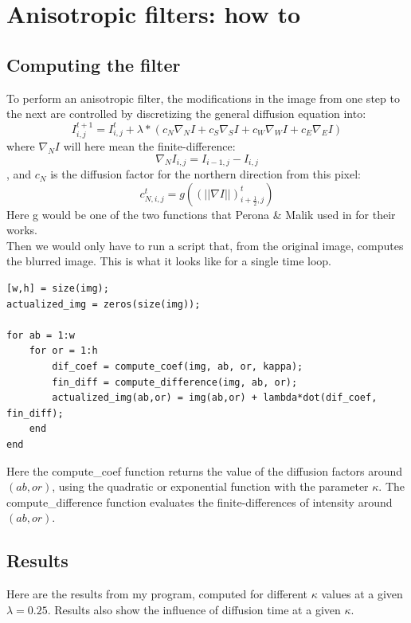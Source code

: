 \documentclass[12pt,a4paper]{article}
\begin{document}
\section{Anisotropic filters: how to}

\subsection{Computing the filter}

To perform an anisotropic filter, the modifications in the image from one step to the next are controlled by discretizing the general diffusion equation into:
\begin{equation}
I_{i,j}^{t+1} = I_{i,j}^{t} + \lambda * (c_{N} \nabla_{N}I + c_{S} \nabla_{S}I + c_{W} \nabla_{W}I + c_{E} \nabla_{E}I)
\end{equation}
where $\nabla_{N}I$ will here mean the finite-difference:
\begin{equation}
\nabla_{N}I_{i,j} = I_{i-1,j} - I_{i,j}
\end{equation} , and $c_{N}$ is the diffusion factor for the northern direction from this pixel: 
\begin{equation}
c_{N,i,j}^{t} = g((||\nabla I||)_{i+\frac{1}{2},j}^{t})
\end{equation}
Here g would be one of the two functions that Perona \& Malik used in for their works.
\\
Then we would only have to run a script that, from the original image, computes the blurred image. This is what it looks like for a single time loop.
\begin{lstlisting}
[w,h] = size(img);
actualized_img = zeros(size(img));

for ab = 1:w
	for or = 1:h
		dif_coef = compute_coef(img, ab, or, kappa);
		fin_diff = compute_difference(img, ab, or);
		actualized_img(ab,or) = img(ab,or) + lambda*dot(dif_coef, fin_diff);
	end
end
\end{lstlisting}
Here the compute\_coef function returns the value of the diffusion factors around $(ab,or)$, using the quadratic or exponential function with the parameter $\kappa$.
The compute\_difference function evaluates the finite-differences of intensity around $(ab,or)$.

\subsection{Results}

Here are the results from my program, computed for different $\kappa$ values at a given $\lambda=0.25$. Results also show the influence of diffusion time at a given $\kappa$.
\end{document}
